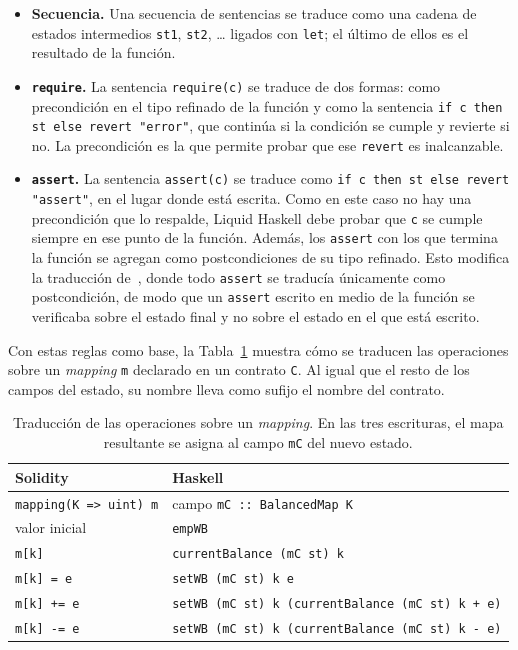 \begin{itemize}
  \item \textbf{Secuencia.} Una secuencia de sentencias se traduce como una cadena de
    estados intermedios \lstinline|st1|, \lstinline|st2|, \ldots{} ligados con
    \lstinline|let|; el último de ellos es el resultado de la función.
  \item \textbf{\lstinline|require|.} La sentencia \lstinline|require(c)| se traduce de
    dos formas: como precondición en el tipo refinado de la función y como la
    sentencia \lstinline[language=LHaskell]|if c then st else revert "error"|, que
    continúa si la condición se cumple y revierte si no. La precondición es la que
    permite probar que ese \lstinline|revert| es inalcanzable.
  \item \textbf{\lstinline|assert|.} La sentencia \lstinline|assert(c)| se traduce
    como \lstinline[language=LHaskell]|if c then st else revert "assert"|, en el lugar
    donde está escrita. Como en este caso no hay una precondición que lo respalde,
    Liquid Haskell debe probar que \lstinline|c| se cumple siempre en ese punto de la
    función. Además, los \lstinline|assert| con los que termina la función se agregan
    como postcondiciones de su tipo refinado. Esto modifica la traducción
    de~\cite{Consoli25}, donde todo \lstinline|assert| se traducía únicamente como
    postcondición, de modo que un \lstinline|assert| escrito en medio de la función se
    verificaba sobre el estado final y no sobre el estado en el que está escrito.
\end{itemize}

Con estas reglas como base, la Tabla~\ref{tab:map-traduccion} muestra cómo se traducen las
operaciones sobre un \emph{mapping} \lstinline|m| declarado en un contrato
\lstinline|C|. Al igual que el resto de los campos del estado, su nombre lleva como
sufijo el nombre del contrato.

\begin{table}[ht]
\centering
\small
\begin{tabular}{ll}
\hline
\textbf{Solidity} & \textbf{Haskell} \\
\hline
\lstinline[language=Solidity]|mapping(K => uint) m| & campo \lstinline[language=LHaskell]|mC :: BalancedMap K| \\
valor inicial & \lstinline[language=LHaskell]|empWB| \\
\lstinline[language=Solidity]|m[k]| & \lstinline[language=LHaskell]|currentBalance (mC st) k| \\
\lstinline[language=Solidity]|m[k] = e| & \lstinline[language=LHaskell]|setWB (mC st) k e| \\
\lstinline[language=Solidity]|m[k] += e| & \lstinline[language=LHaskell]|setWB (mC st) k (currentBalance (mC st) k + e)| \\
\lstinline[language=Solidity]|m[k] -= e| & \lstinline[language=LHaskell]|setWB (mC st) k (currentBalance (mC st) k - e)| \\
\hline
\end{tabular}
\caption{Traducción de las operaciones sobre un \emph{mapping}. En las tres escrituras, el
  mapa resultante se asigna al campo \lstinline|mC| del nuevo estado.}
\label{tab:map-traduccion}
\end{table}

